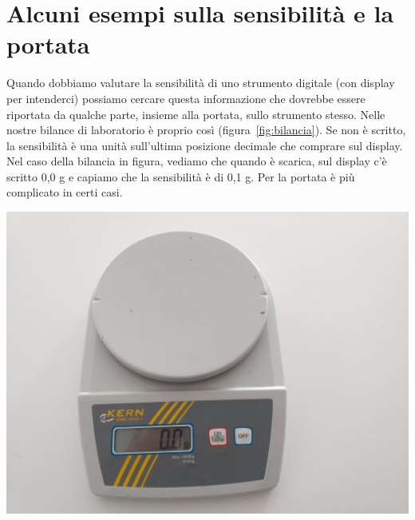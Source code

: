\section{Alcuni esempi sulla sensibilità e la portata}
Quando dobbiamo valutare la sensibilità di uno strumento digitale (con display per intenderci) possiamo cercare questa informazione che dovrebbe essere riportata da qualche parte, insieme alla portata, sullo strumento stesso. Nelle nostre bilance di laboratorio è proprio così (figura~\ref{fig:bilancia}). Se non è scritto, la sensibilità è una unità sull'ultima posizione decimale che comprare sul display. Nel caso della bilancia in figura, vediamo che quando è scarica, sul display c'è scritto 0,0 g e capiamo che la sensibilità è di 0,1 g. Per la portata è più complicato in certi casi. 

\begin{testexample}
	
\begin{minipage}{\linewidth}
	\centering
	\includegraphics[scale=0.14]{bilancia}
	\label{fig:bilancia}
\end{minipage}
	
	
\end{testexample}
